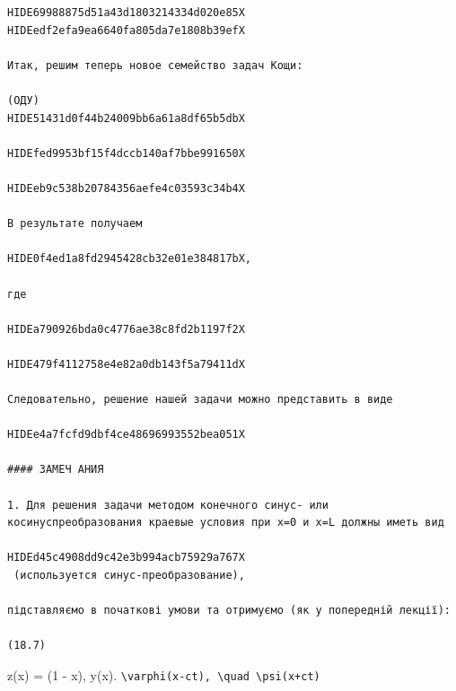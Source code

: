 \documentclass[
  ukrainian,
]{article}
\begin{document}
\begin{verbatim}
HIDE69988875d51a43d1803214334d020e85X HIDEedf2efa9ea6640fa805da7e1808b39efX

Итак, решим теперь новое семейство задач Кощи:

(ОДУ) 
HIDE51431d0f44b24009bb6a61a8df65b5dbX

HIDEfed9953bf15f4dccb140af7bbe991650X

HIDEeb9c538b20784356aefe4c03593c34b4X

В результате получаем

HIDE0f4ed1a8fd2945428cb32e01e384817bX,

где

HIDEa790926bda0c4776ae38c8fd2b1197f2X

HIDE479f4112758e4e82a0db143f5a79411dX

Следовательно, решение нашей задачи можно представить в виде

HIDEe4a7fcfd9dbf4ce48696993552bea051X

#### ЗАМЕЧ АНИЯ

1. Для решения задачи методом конечного синус- или косинуспреобразования краевые условия при x=0 и x=L должны иметь вид

HIDEd45c4908dd9c42e3b994acb75929a767X
 (используется синус-преобразование),  

підставляємо в початкові умови та отримуємо (як у попередній лекції):

(18.7)
\end{verbatim}

z(x) = (1 - x), y(x).
\texttt{\textbackslash{}varphi(x-ct),\ \textbackslash{}quad\ \textbackslash{}psi(x+ct)}
\end{document}
